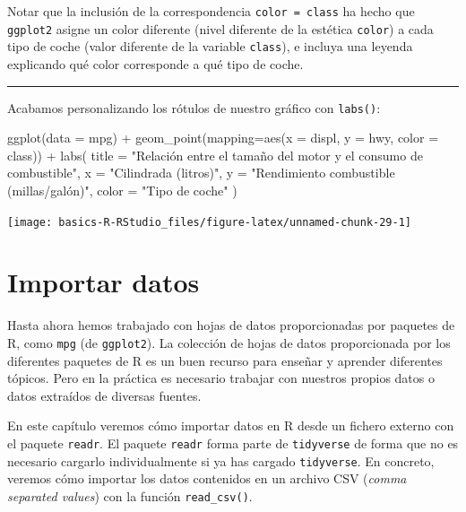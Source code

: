 \documentclass[
  title=normal,
  notoc,
  bib=normal]{mnye}
\newenvironment{Shaded}{\begin{snugshade}}{\end{snugshade}}
\newcommand{\AttributeTok}[1]{\textcolor[rgb]{0.77,0.63,0.00}{#1}}
\newcommand{\FunctionTok}[1]{\textcolor[rgb]{0.00,0.00,0.00}{#1}}
\newcommand{\NormalTok}[1]{#1}
\newcommand{\SpecialCharTok}[1]{\textcolor[rgb]{0.00,0.00,0.00}{#1}}
\newcommand{\StringTok}[1]{\textcolor[rgb]{0.31,0.60,0.02}{#1}}
\begin{document}
Notar que la inclusión de la correspondencia \texttt{color\ =\ class} ha hecho que \texttt{ggplot2} asigne un color diferente (nivel diferente de la estética \texttt{color}) a cada tipo de coche (valor diferente de la variable \texttt{class}), e incluya una leyenda explicando qué color corresponde a qué tipo de coche.

\begin{center}\rule{0.5\linewidth}{0.5pt}\end{center}

Acabamos personalizando los rótulos de nuestro gráfico con \texttt{labs()}:

\begin{Shaded}
\begin{Highlighting}[]
\FunctionTok{ggplot}\NormalTok{(}\AttributeTok{data =}\NormalTok{ mpg) }\SpecialCharTok{+} 
    \FunctionTok{geom\_point}\NormalTok{(}\AttributeTok{mapping=}\FunctionTok{aes}\NormalTok{(}\AttributeTok{x =}\NormalTok{ displ, }\AttributeTok{y =}\NormalTok{ hwy, }\AttributeTok{color =}\NormalTok{ class)) }\SpecialCharTok{+}
    \FunctionTok{labs}\NormalTok{(}
        \AttributeTok{title =} \StringTok{"Relación entre el tamaño del motor y el consumo de combustible"}\NormalTok{, }
        \AttributeTok{x =} \StringTok{"Cilindrada (litros)"}\NormalTok{,}
        \AttributeTok{y =} \StringTok{"Rendimiento combustible (millas/galón)"}\NormalTok{,}
        \AttributeTok{color =} \StringTok{"Tipo de coche"}
\NormalTok{     )}
\end{Highlighting}
\end{Shaded}

\begin{center}\texttt{[image: basics-R-RStudio\_files/figure-latex/unnamed-chunk-29-1]} \end{center}

\hypertarget{import}{%
\section{Importar datos}\label{import}}

Hasta ahora hemos trabajado con hojas de datos proporcionadas por paquetes de \textsf{R}, como \texttt{mpg} (de \texttt{ggplot2}). La colección de hojas de datos proporcionada por los diferentes paquetes de \textsf{R} es un buen recurso para enseñar y aprender diferentes tópicos. Pero en la práctica es necesario trabajar con nuestros propios datos o datos extraídos de diversas fuentes.

En este capítulo veremos cómo importar datos en \textsf{R} desde un fichero externo con el paquete \texttt{readr}. El paquete \texttt{readr} forma parte de \texttt{tidyverse} de forma que no es necesario cargarlo individualmente si ya has cargado \texttt{tidyverse}. En concreto, veremos cómo importar los datos contenidos en un archivo CSV (\emph{comma separated values}) con la función \texttt{read\_csv()}.
\end{document}
